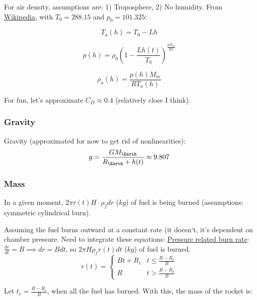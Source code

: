 \documentclass[12pt,a4paper]{article}
\begin{document}
For air density, assumptions are: 1) Troposphere, 2) No humidity. From \href{https://en.wikipedia.org/wiki/Density_of_air#Altitude}{Wikipedia}, with $T_0 = 288.15$ and $p_0 = 101.325$:

\begin{equation}
T_a(h) = T_0 - Lh
\label{eq:air-temp}
\end{equation}

\begin{equation}
p(h) = \rho_0\left(1-\frac{Lh(t)}{T_0}\right)^\frac{gM_m}{RL}
\label{eq:air-pressure}
\end{equation}

\begin{equation}
\rho_a(h) = \frac{p(h)M_m}{RT_a(h)}
\label{eq:air-density}
\end{equation}

For fun, let’s approximate $C_D \approx 0.4$ (relatively close I think).

\subsubsection{Gravity}
Gravity (approximated for now to get rid of nonlinearities):
$$g=\frac{GM_{\Earth}}{R_{\Earth} + h(t)} \approx 9.807$$

\subsubsection{Mass}
In a given moment, $2\pi r(t) H \cdot \rho_f dr$ ($kg$) of fuel is being burned (assumptions: symmetric cylindrical burn). 

Assuming the fuel burns outward at a constant rate (it doesn‘t, it’s dependent on chamber pressure. Need to integrate these equations: \hyperlink{https://www.nakka-rocketry.net/burnrate.html}{Pressure related burn rate}: $\frac{dr}{dt}=B\implies dr=Bdt$, so $2\pi H \rho_f r(t)dt$ ($kg$) of fuel is burned.
\begin{equation}
r(t) = \begin{cases}
Bt + R_c & t \le \frac{R - R_c}{B} \\
R      & t > \frac{R - R_c}{B}
\end{cases}
\label{eq:inner-radius}
\end{equation}

Let $t_e = \frac{R-R_c}{B}$, when all the fuel has burned. With this, the mass of the rocket is:
\end{document}
